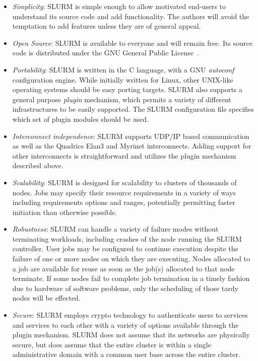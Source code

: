 \begin{itemize}
\item {\em Simplicity}: SLURM is simple enough to allow motivated end-users
to understand its source code and add functionality.  The authors will 
avoid the temptation to add features unless they are of general appeal. 

\item {\em Open Source}: SLURM is available to everyone and will remain free. 
Its source code is distributed under the GNU General Public 
License~\cite{GPLWeb}.

\item {\em Portability}: SLURM is written in the C language, with a GNU 
{\em autoconf} configuration engine.  
While initially written for Linux, other UNIX-like operating systems 
should be easy porting targets.
SLURM also supports a general purpose {\em plugin} mechanism, which 
permits a variety of different infrastructures to be easily supported. 
The SLURM configuration file specifies which set of plugin modules 
should be used. 

\item {\em Interconnect independence}: SLURM supports UDP/IP based
communication as well as the Quadrics Elan3 and Myrinet interconnects.  
Adding support for other interconnects is straightforward and utilizes 
the plugin mechanism described above.

\item {\em Scalability}: SLURM is designed for scalability to clusters of
thousands of nodes. 
Jobs may specify their resource requirements in a variety of ways 
including requirements options and ranges, potentially permitting 
faster initiation than otherwise possible.

\item {\em Robustness}: SLURM can handle a variety of failure modes
without terminating workloads, including crashes of the node running 
the SLURM controller. 
User jobs may be configured to continue execution despite the failure 
of one or more nodes on which they are executing. 
Nodes allocated to a job are available for reuse as soon as the job(s) 
allocated to that node terminate. 
If some nodes fail to complete job termination 
in a timely fashion due to hardware of software problems, only the 
scheduling of those tardy nodes will be effected.

\item {\em Secure}: SLURM employs crypto technology to authenticate 
users to services and services to each other with a variety of options 
available through the plugin mechanism.  
SLURM does not assume that its networks are physically secure, 
but does assume that the entire cluster is within a single 
administrative domain with a common user base across the 
entire cluster.


\end{itemize}
